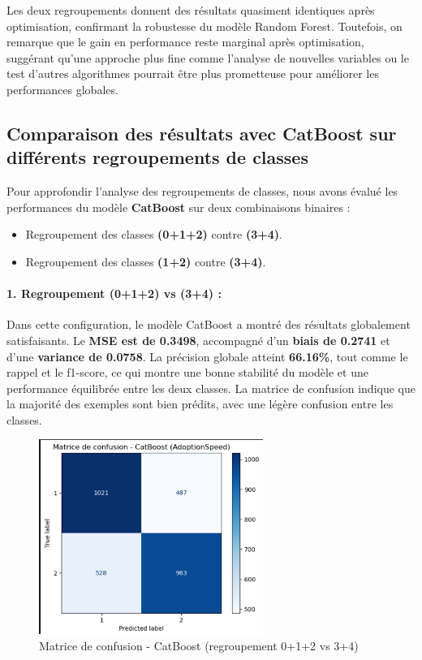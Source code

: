 \documentclass[a4paper,12pt]{article}
\begin{document}
Les deux regroupements donnent des résultats quasiment identiques après optimisation, confirmant la robustesse du modèle Random Forest. Toutefois, on remarque que le gain en performance reste marginal après optimisation, suggérant qu’une approche plus fine comme l’analyse de nouvelles variables ou le test d’autres algorithmes pourrait être plus prometteuse pour améliorer les performances globales.

\subsection{Comparaison des résultats avec CatBoost sur différents regroupements de classes}

Pour approfondir l’analyse des regroupements de classes, nous avons évalué les performances du modèle \textbf{CatBoost} sur deux combinaisons binaires : 
\begin{itemize}
    \item Regroupement des classes \textbf{(0+1+2)} contre \textbf{(3+4)}.
    \item Regroupement des classes \textbf{(1+2)} contre \textbf{(3+4)}.
\end{itemize}

\paragraph{1. Regroupement (0+1+2) vs (3+4) :}

Dans cette configuration, le modèle CatBoost a montré des résultats globalement satisfaisants. Le \textbf{MSE est de 0.3498}, accompagné d’un \textbf{biais de 0.2741} et d’une \textbf{variance de 0.0758}. La précision globale atteint \textbf{66.16\%}, tout comme le rappel et le f1-score, ce qui montre une bonne stabilité du modèle et une performance équilibrée entre les deux classes. La matrice de confusion indique que la majorité des exemples sont bien prédits, avec une légère confusion entre les classes.

\begin{figure}[H]
    \centering
    \includegraphics[width=0.65\textwidth]{catboost_012_vs_34_confusion.png}
    \caption{Matrice de confusion - CatBoost (regroupement 0+1+2 vs 3+4)}
    \label{fig:catboost012_conf}
\end{figure}
\end{document}
